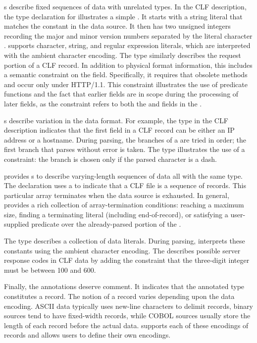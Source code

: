 \documentclass{sigplanconf}
\begin{document}
s describe fixed sequences of data with unrelated types.
In the CLF description, the type declaration for
 illustrates a simple . It starts with a 
string literal that matches the constant  in the data source.  It 
then has two unsigned integers recording the major and minor version numbers
separated by the literal character .  \pads{} supports character, string,
and regular expression literals, which are interpreted with the ambient character 
encoding. The type  
similarly describes the request portion of a CLF record.  In addition
to physical format information, this  includes a semantic constraint
on the  field.  Specifically, it requires that obsolete methods
 and  occur only under HTTP/1.1.  This constraint illustrates
the use of predicate functions and the fact 
that earlier fields are in scope during the processing of later fields, as the 
constraint
refers to both the  and  fields in the .

s describe variation in the data format.  For example, the
 type in the CLF description indicates that the first
field in a CLF record can be either an IP address or a hostname.
During parsing, the branches of a  are tried in order; the
first branch that parses without error is taken.  The 
type illustrates the use of a constraint: the branch 
is chosen only if the parsed character is a dash.  

\pads{} provides s to describe varying-length sequences of
data all with the same type.  The  declaration  uses a
 to indicate that a CLF file is a sequence of 
records.  This particular array terminates when the data source is
exhausted. In general, \pads{} provides a rich
collection of array-termination conditions: reaching a maximum size,
finding a terminating literal (including end-of-record), or satisfying a
user-supplied predicate over the already-parsed portion of the . 

The
 type  describes a collection of data literals.
During parsing, \pads{} interprets these constants using the ambient
character encoding.  The   describes
possible server response codes in CLF data by adding the constraint
that the three-digit integer must be between 100 and 600.

Finally, the  annotations deserve comment. It
indicates that the annotated type constitutes a record.  
The notion of a record varies depending upon the data encoding.  
ASCII data typically uses new-line characters to delimit 
records, binary sources tend to have fixed-width records, while 
COBOL sources usually store the length of each record before the actual data.
\pads{} supports each of these encodings of records and allows users to define
their own encodings.  
\end{document}
